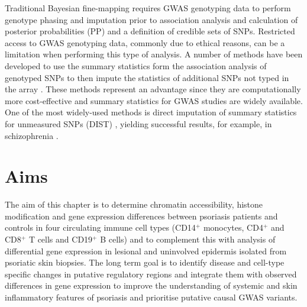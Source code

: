 Traditional Bayesian fine-mapping requires GWAS genotyping data to perform genotype phasing and imputation prior to association analysis and calculation of posterior probabilities (PP) and a definition of credible sets of SNPs. Restricted access to GWAS genotyping data, commonly due to ethical reasons, can be a limitation when performing this type of analysis. A number of methods have been developed to use the summary statistics form the association analysis of genotyped SNPs to then impute the statistics of additional SNPs not typed in the array \parencite{Pasaniuc2017}. These methods represent an advantage since they are computationally more cost-effective and summary statistics for GWAS studies are widely available. One of the most widely-used methods is direct imputation of summary statistics for unmeasured SNPs (DIST) \parencite{Lee2013}, yielding successful results, for example, in schizophrenia \parencite{Edwards2015}. %






\section{Aims}
The aim of this chapter is to determine chromatin accessibility, histone modification and gene expression differences between psoriasis patients and controls in four circulating immune cell types (CD14$^+$ monocytes, CD4$^+$ and CD8$^+$ T cells and CD19$^+$ B cells) and to complement this with analysis of differential gene expression in lesional and uninvolved epidermis isolated from psoriatic skin biopsies. The long term goal is to identify disease and cell-type specific changes in putative regulatory regions and integrate them with observed differences in gene expression to improve the understanding of systemic and skin inflammatory features of psoriasis and prioritise putative causal GWAS variants.

